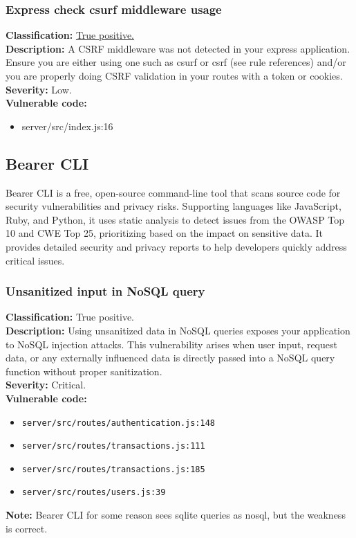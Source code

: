 \documentclass[]{article}
\begin{document}
\subsubsection{Express check csurf middleware usage}
\textbf{Classification:} \hyperref[subsubsec:csrf_with_samesite_none_misconfiguration]{True positive.} \\ 
\textbf{Description:} A CSRF middleware was not detected in your express application. Ensure you are either using 
one such as csurf or csrf (see rule references) and/or you are properly doing CSRF validation in your routes with 
a token or cookies.\\ 
\textbf{Severity:} Low. \\ 
\textbf{Vulnerable code:} 
\begin{itemize}
    \item server/src/index.js:16
\end{itemize}

\subsection{Bearer CLI}
Bearer CLI is a free, open-source command-line tool that scans source code for security vulnerabilities and privacy risks. Supporting languages like JavaScript, Ruby, and Python, it uses static analysis to detect issues from the OWASP Top 10 and CWE Top 25, prioritizing based on the impact on sensitive data. It provides detailed security and privacy reports to help developers quickly address critical issues.

\subsubsection{Unsanitized input in NoSQL query}
\textbf{Classification:} True positive. \\
\textbf{Description:} Using unsanitized data in NoSQL queries exposes your application to NoSQL injection attacks. This vulnerability arises when user input, request data, or any externally influenced data is directly passed into a NoSQL query function without proper sanitization. \\
\textbf{Severity:} Critical. \\ 
\textbf{Vulnerable code:}
\begin{itemize}
    \item \texttt{server/src/routes/authentication.js:148}
    \item \texttt{server/src/routes/transactions.js:111}
    \item \texttt{server/src/routes/transactions.js:185}
    \item \texttt{server/src/routes/users.js:39}
\end{itemize}
\textbf{Note:} Bearer CLI for some reason sees sqlite queries as nosql, but the weakness is correct.
\end{document}
